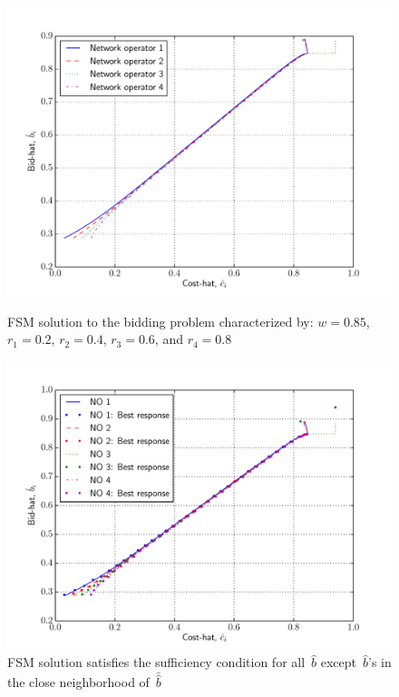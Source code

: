 \begin{figure}[p!]
  \includegraphics[width=\figsize]{Indirect/Figures/forward_shooting_4}
  \caption{FSM solution to the bidding problem characterized by: $w=0.85$, $r_1 = 0.2$, $r_2 = 0.4$, $r_3 = 0.6$, and $r_4=0.8$}
  \label{fig:forward_shooting_4_indirect}
  \vspace{10mm}
  \includegraphics[width=\figsize]{Indirect/Figures/forward_shooting_4_sufficiency}
  \caption{FSM solution satisfies the sufficiency condition for all~$\hat{b}$ except~$\hat{b}$'s in the close neighborhood of~$\bar{\hat{b}}$}
  \label{fig:forward_shooting_4_sufficiency_indirect}
\end{figure}

